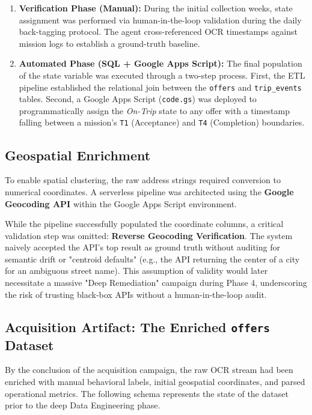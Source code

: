 \begin{enumerate}
    \item \textbf{Verification Phase (Manual):} During the initial collection weeks, state assignment was performed via human-in-the-loop validation during the daily back-tagging protocol. The agent cross-referenced OCR timestamps against mission logs to establish a ground-truth baseline.
    
    \item \textbf{Automated Phase (SQL + Google Apps Script):} The final population of the state variable was executed through a two-step process. First, the ETL pipeline established the relational join between the \texttt{offers} and \texttt{trip\_events} tables. Second, a Google Apps Script (\texttt{code.gs}) was deployed to programmatically assign the \textit{On-Trip} state to any offer with a timestamp falling between a mission’s \texttt{T1} (Acceptance) and \texttt{T4} (Completion) boundaries.
\end{enumerate}






\subsection{Geospatial Enrichment}
To enable spatial clustering, the raw address strings required conversion to numerical coordinates. A serverless pipeline was architected using the \textbf{Google Geocoding API} within the Google Apps Script environment.

While the pipeline successfully populated the coordinate columns, a critical validation step was omitted: \textbf{Reverse Geocoding Verification}. The system naively accepted the API's top result as ground truth without auditing for semantic drift or "centroid defaults" (e.g., the API returning the center of a city for an ambiguous street name). This assumption of validity would later necessitate a massive "Deep Remediation" campaign during Phase 4, underscoring the risk of trusting black-box APIs without a human-in-the-loop audit.


\subsection{Acquisition Artifact: The Enriched \texttt{offers} Dataset}
By the conclusion of the acquisition campaign, the raw OCR stream had been enriched with manual behavioral labels, initial geospatial coordinates, and parsed operational metrics. The following schema represents the state of the dataset prior to the deep Data Engineering phase.

